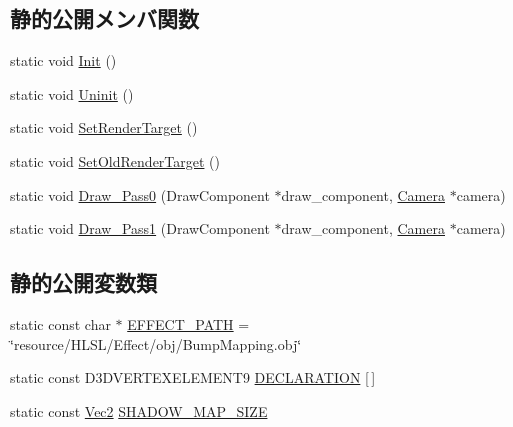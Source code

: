 \subsection*{静的公開メンバ関数}
\begin{DoxyCompactItemize}
\item 
static void \mbox{\hyperlink{class_depth_buffer_shadow_object_a03e23f51e5e68babc7a1a42d0fedfba0}{Init}} ()
\item 
static void \mbox{\hyperlink{class_depth_buffer_shadow_object_a6f5e6542143cffef6b7a9e69f6c9cd94}{Uninit}} ()
\item 
static void \mbox{\hyperlink{class_depth_buffer_shadow_object_ac575084492645de134c6f1990ed7d2dc}{Set\+Render\+Target}} ()
\item 
static void \mbox{\hyperlink{class_depth_buffer_shadow_object_a2ac079b069c8f60b8d681868b9afce89}{Set\+Old\+Render\+Target}} ()
\item 
static void \mbox{\hyperlink{class_depth_buffer_shadow_object_a7916c03b90a01c71a9050e721cf6810c}{Draw\+\_\+\+Pass0}} (Draw\+Component $\ast$draw\+\_\+component, \mbox{\hyperlink{class_camera}{Camera}} $\ast$camera)
\item 
static void \mbox{\hyperlink{class_depth_buffer_shadow_object_a4bf8a72a447aa6ff150f3fef630ab448}{Draw\+\_\+\+Pass1}} (Draw\+Component $\ast$draw\+\_\+component, \mbox{\hyperlink{class_camera}{Camera}} $\ast$camera)
\end{DoxyCompactItemize}
\subsection*{静的公開変数類}
\begin{DoxyCompactItemize}
\item 
static const char $\ast$ \mbox{\hyperlink{class_depth_buffer_shadow_object_aaa0b1c0ca424614c5cf7368f00fa5fa0}{E\+F\+F\+E\+C\+T\+\_\+\+P\+A\+TH}} = \char`\"{}resource/H\+L\+SL/Effect/obj/Bump\+Mapping.\+obj\char`\"{}
\item 
static const D3\+D\+V\+E\+R\+T\+E\+X\+E\+L\+E\+M\+E\+N\+T9 \mbox{\hyperlink{class_depth_buffer_shadow_object_a9238d9843ca8654d67809dfbd5600137}{D\+E\+C\+L\+A\+R\+A\+T\+I\+ON}} \mbox{[}$\,$\mbox{]}
\item 
static const \mbox{\hyperlink{_vector3_d_8h_a5ef6e95dfc5f9d3820b71772d99bbc25}{Vec2}} \mbox{\hyperlink{class_depth_buffer_shadow_object_aa7a8ac55e3de545dacb0cfde57fd1017}{S\+H\+A\+D\+O\+W\+\_\+\+M\+A\+P\+\_\+\+S\+I\+ZE}}
\end{DoxyCompactItemize}
